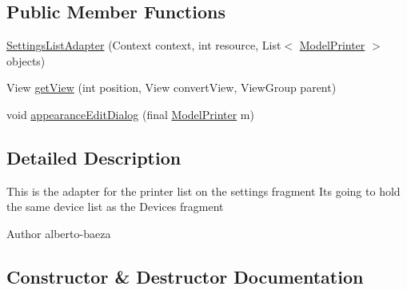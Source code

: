 \subsection*{Public Member Functions}
\begin{DoxyCompactItemize}
\item 
\hyperlink{classandroid_1_1app_1_1printerapp_1_1settings_1_1_settings_list_adapter_a81257cd8a4a35f0f2abe3b24374ecc3a}{Settings\+List\+Adapter} (Context context, int resource, List$<$ \hyperlink{classandroid_1_1app_1_1printerapp_1_1model_1_1_model_printer}{Model\+Printer} $>$ objects)
\item 
View \hyperlink{classandroid_1_1app_1_1printerapp_1_1settings_1_1_settings_list_adapter_a06866bbf19a1c64ca520598ade3df338}{get\+View} (int position, View convert\+View, View\+Group parent)
\item 
void \hyperlink{classandroid_1_1app_1_1printerapp_1_1settings_1_1_settings_list_adapter_a9c61998830be8994d04b2b1a33f0dd8a}{appearance\+Edit\+Dialog} (final \hyperlink{classandroid_1_1app_1_1printerapp_1_1model_1_1_model_printer}{Model\+Printer} m)
\end{DoxyCompactItemize}


\subsection{Detailed Description}
This is the adapter for the printer list on the settings fragment It\textquotesingle{}s going to hold the same device list as the Devices fragment

\begin{DoxyAuthor}{Author}
alberto-\/baeza 
\end{DoxyAuthor}


\subsection{Constructor \& Destructor Documentation}
\mbox{\label{classandroid_1_1app_1_1printerapp_1_1settings_1_1_settings_list_adapter_a81257cd8a4a35f0f2abe3b24374ecc3a}} 
